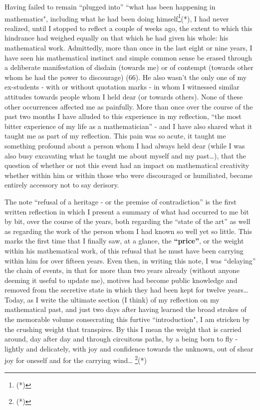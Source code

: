 Having failed to remain ``plugged into'' ``what has been happening in mathematics", 
including what he had been doing himself\footnote{(*)}(*), I had never realized,
until I stopped to reflect a couple of weeks ago, the extent to which this hindrance
had weighed equally on that which he had given his whole: his mathematical work.
Admittedly, more than once in the last eight or nine years, I have seen his mathematical
instinct and simple common sense be erased through a deliberate manifestation of disdain 
(towards me) or of contempt (towards other whom he had the power to discourage) (66).
He also wasn't the only one of my ex-students - with or without quotation marks - 
in whom I witnessed similar attitudes towards people whom I held dear 
(or towards others). None of these other occurrences affected me as painfully.
More than once over the course of the past two months I have alluded to this experience in
my reflection, ``the most bitter experience of my life as a mathematician'' 
- and I have also shared what it taught me as part of my reflection.
This pain was so acute, it taught me something profound about a person whom I had
always held dear (while I was also busy excavating what he taught me about myself and my
past\ldots),
that the question of whether or not this event had an impact on mathematical creativity
whether within him or within those who were discouraged or humiliated, became entirely
accessory not to say derisory.

The note ``refusal of a heritage - or the premise of contradiction'' is the first written
reflection in which I present a summary of what had occurred to me bit by bit, over
the course of the years, both regarding the ``state of the art'' as well as regarding the
work of the person whom I had known so well yet so little.
This marks the first time that I finally saw, at a glance, the \textbf{``price''}, or the
weight within his mathematical work, of this refusal that he must have been carrying within him
for over fifteen years.
Even then, in writing this note, I was ``delaying'' the chain of events, 
in that for more than two years already (without anyone deeming it useful to update me),
motives had become public knowledge and removed from the secretive state in which they had
been kept for twelve years\ldots
Today, as I write the ultimate section (I think) of my reflection on my mathematical past,
and just two days after having learned the broad
strokes of the memorable volume 
consecrating this furtive ``introduction", I am stricken by the 
crushing weight that transpires.
By this I mean the weight that is carried around, 
day after day and through circuitous paths,
by a being born to fly - lightly and delicately, with joy and confidence towards the
unknown, out of shear joy for oneself and for the carrying wind\ldots
\footnote{(*)}(*)

